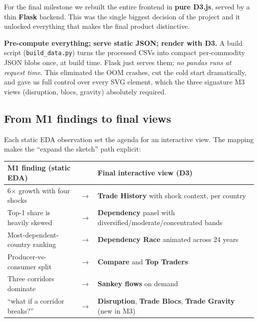 \documentclass[a4paper,10pt]{article}
\begin{document}
For the final milestone we rebuilt the entire frontend in \textbf{pure D3.js},
served by a thin \textbf{Flask} backend. This was the single biggest decision of
the project and it unlocked everything that makes the final product distinctive.

\begin{decision}
\textbf{Pre-compute everything; serve static JSON; render with D3.}
A build script (\texttt{build\_data.py}) turns the processed CSVs into compact
per-commodity JSON blobs once, at build time. Flask just serves them; \emph{no
pandas runs at request time}. This eliminated the OOM crashes, cut the cold start
dramatically, and gave us full control over every SVG element, which the three
signature M3 views (disruption, blocs, gravity) absolutely required.
\end{decision}

\subsection{From M1 findings to final views}

Each static EDA observation set the agenda for an interactive view. The mapping
makes the ``expand the sketch'' path explicit:

\begin{table}[H]
\centering\small
\renewcommand{\arraystretch}{1.2}
\begin{tabular}{@{}p{5.4cm}p{0.7cm}p{9.7cm}@{}}
\toprule
\textbf{M1 finding (static EDA)} & & \textbf{Final interactive view (D3)} \\
\midrule
6$\times$ growth with four shocks &$\rightarrow$& \textbf{Trade History} with shock context, per country \\
Top-1 share is heavily skewed &$\rightarrow$& \textbf{Dependency} panel with diversified/moderate/concentrated bands \\
Most-dependent-country ranking &$\rightarrow$& \textbf{Dependency Race} animated across 24 years \\
Producer-vs-consumer split &$\rightarrow$& \textbf{Compare} and \textbf{Top Traders} \\
Three corridors dominate &$\rightarrow$& \textbf{Sankey flows} on demand \\
``what if a corridor breaks?'' &$\rightarrow$& \textbf{Disruption}, \textbf{Trade Blocs}, \textbf{Trade Gravity} (new in M3) \\
\bottomrule
\end{tabular}
\end{table}
\end{document}
